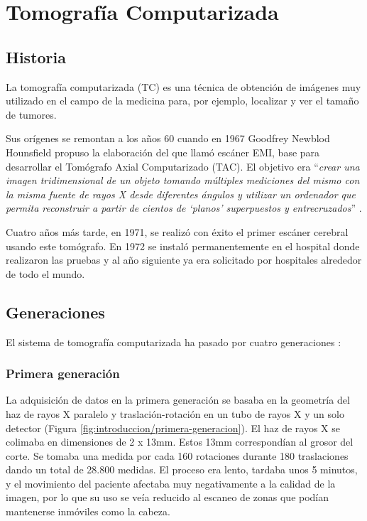 \section{Tomografía Computarizada}

\subsection{Historia}

La tomografía computarizada (TC) es una técnica de obtención de imágenes muy utilizado en el campo de la medicina para, por ejemplo, localizar y ver el tamaño de tumores.

Sus orígenes se remontan a los años 60 cuando en 1967 Goodfrey Newblod Hounsfield propuso la elaboración del que llamó escáner EMI, base para desarrollar el Tomógrafo Axial Computarizado (TAC). El objetivo era ``\textit{crear una imagen tridimensional de un objeto tomando múltiples mediciones del mismo con la misma fuente de rayos X desde diferentes ángulos y utilizar un ordenador que permita reconstruir a partir de cientos de `planos' superpuestos y entrecruzados}'' \cite{gonzales11}.

Cuatro años más tarde, en 1971, se realizó con éxito el primer escáner cerebral usando este tomógrafo. En 1972 se instaló permanentemente en el hospital donde realizaron las pruebas y al año siguiente ya era solicitado por hospitales alrededor de todo el mundo.

\subsection{Generaciones}

El sistema de tomografía computarizada ha pasado por cuatro generaciones \cite{sarrio16}:

\subsubsection{Primera generación}

La adquisición de datos en la primera generación se basaba en la geometría del haz de rayos X paralelo y traslación-rotación en un tubo de rayos X y un solo detector (Figura \ref{fig:introduccion/primera-generacion}). El haz de rayos X se colimaba en dimensiones de 2 x 13mm. Estos 13mm correspondían al grosor del corte. Se tomaba una medida por cada 160 rotaciones durante 180 traslaciones dando un total de 28.800 medidas. El proceso era lento, tardaba unos 5 minutos, y el movimiento del paciente afectaba muy negativamente a la calidad de la imagen, por lo que su uso se veía reducido al escaneo de zonas que podían mantenerse inmóviles como la cabeza.

